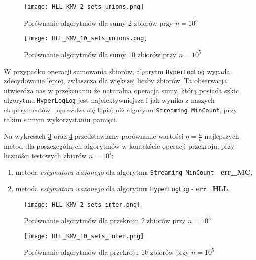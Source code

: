 \begin{figure}[h!]
	\texttt{[image: HLL\_KMV\_2\_sets\_unions.png]}
	\centering
	\caption{Porównanie algorytmów dla sumy 2 zbiorów przy $n=10^5$}
	\label{fig:HLL_KMV_2_sets_unions}
\end{figure}

\begin{figure}[h!]
	\texttt{[image: HLL\_KMV\_10\_sets\_unions.png]}
	\centering
	\caption{Porównanie algorytmów dla sumy 10 zbiorów przy $n=10^5$}
	\label{fig:HLL_KMV_10_sets_unions}
\end{figure}
W przypadku operacji sumowania zbiorów, algorytm \texttt{HyperLogLog} wypada zdecydowanie lepiej, zwłaszcza dla większej liczby zbiorów. Ta obserwacja utwierdza nas w przekonaniu że naturalna operacja sumy, którą posiada szkic algorytmu \texttt{HyperLogLog} jest najefektywniejsza i jak wynika z naszych eksperymentów - sprawdza się lepiej niż algorytm \texttt{Streaming MinCount}, przy takim samym wykorzystaniu pamięci.

Na wykresach \ref{fig:HLL_KMV_2_sets_inter} oraz \ref{fig:HLL_KMV_10_sets_inter} przedstawiamy porównanie wartości $\eta = \frac{\hat{n}}{n}$ najlepszych metod dla poszczególnych algorytmów w kontekście operacji przekroju, przy liczności testowych zbiorów $n=10^5$:
\begin{enumerate}
	\item metoda \textit{estymatora ważonego} dla algorytmu \texttt{Streaming MinCount} - \textbf{err\_MC},
	\item metoda \textit{estymatora ważonego} dla algorytmu \texttt{HyperLogLog} - \textbf{err\_HLL}.
\end{enumerate}

\begin{figure}[h!]
	\texttt{[image: HLL\_KMV\_2\_sets\_inter.png]}
	\centering
	\caption{Porównanie algorytmów dla przekroju 2 zbiorów przy $n=10^5$}
	\label{fig:HLL_KMV_2_sets_inter}
\end{figure}

\begin{figure}[h!]
	\texttt{[image: HLL\_KMV\_10\_sets\_inter.png]}
	\centering
	\caption{Porównanie algorytmów dla przekroju 10 zbiorów przy $n=10^5$}
	\label{fig:HLL_KMV_10_sets_inter}
\end{figure}


